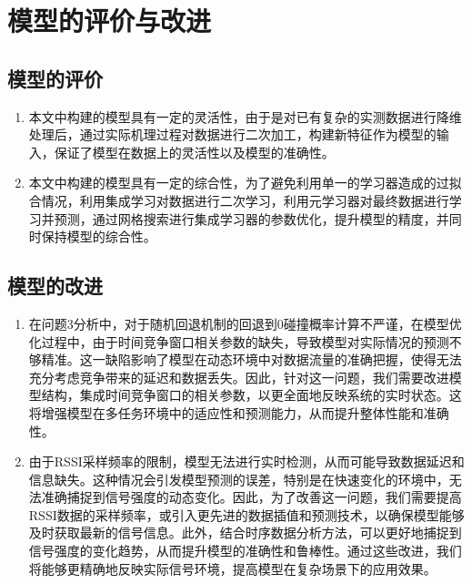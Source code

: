 \documentclass[bwprint,fontset=windows]{gmcmthesis}
\begin{document}




% 
% 
% 
% 

% 
% 




\section{模型的评价与改进}
\subsection{模型的评价}

\begin{enumerate}
	\item 本文中构建的模型具有一定的灵活性，由于是对已有复杂的实测数据进行降维处理后，通过实际机理过程对数据进行二次加工，构建新特征作为模型的输入，保证了模型在数据上的灵活性以及模型的准确性。
	\item 本文中构建的模型具有一定的综合性，为了避免利用单一的学习器造成的过拟合情况，利用集成学习对数据进行二次学习，利用元学习器对最终数据进行学习并预测，通过网格搜索进行集成学习器的参数优化，提升模型的精度，并同时保持模型的综合性。
\end{enumerate}

\subsection{模型的改进}

\begin{enumerate}
	\item 在问题3分析中，对于随机回退机制的回退到0碰撞概率计算不严谨，在模型优化过程中，由于时间竞争窗口相关参数的缺失，导致模型对实际情况的预测不够精准。这一缺陷影响了模型在动态环境中对数据流量的准确把握，使得无法充分考虑竞争带来的延迟和数据丢失。因此，针对这一问题，我们需要改进模型结构，集成时间竞争窗口的相关参数，以更全面地反映系统的实时状态。这将增强模型在多任务环境中的适应性和预测能力，从而提升整体性能和准确性。
	
	\item 由于RSSI采样频率的限制，模型无法进行实时检测，从而可能导致数据延迟和信息缺失。这种情况会引发模型预测的误差，特别是在快速变化的环境中，无法准确捕捉到信号强度的动态变化。因此，为了改善这一问题，我们需要提高RSSI数据的采样频率，或引入更先进的数据插值和预测技术，以确保模型能够及时获取最新的信号信息。此外，结合时序数据分析方法，可以更好地捕捉到信号强度的变化趋势，从而提升模型的准确性和鲁棒性。通过这些改进，我们将能够更精确地反映实际信号环境，提高模型在复杂场景下的应用效果。
\end{enumerate}
\end{document}
